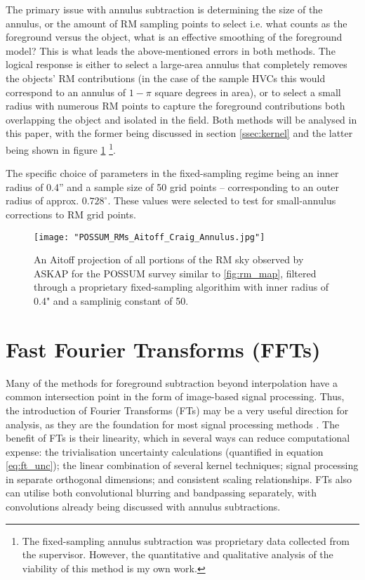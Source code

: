 The primary issue with annulus subtraction is determining the size of the annulus, or the amount of RM sampling points to select i.e. what counts as the foreground versus the object, what is an effective smoothing of the foreground model? This is what leads the above-mentioned errors in both methods. The logical response is either to select a large-area annulus that completely removes the objects' RM contributions (in the case of the sample HVCs this would correspond to an annulus of $1-\pi$ square degrees in area), or to select a small radius with numerous RM points to capture the foreground contributions both overlapping the object and isolated in the field. Both methods will be analysed in this paper, with the former being discussed in section \ref{ssec:kernel} and the latter being shown in figure \ref{fig:annulus_sky} \footnote{The fixed-sampling annulus subtraction was proprietary data collected from the supervisor. However, the quantitative and qualitative analysis of the viability of this method is my own work.}.

The specific choice of parameters in the fixed-sampling regime being an inner radius of 0.4” and a sample size of 50 grid points – corresponding to an outer radius of approx. $0.728^{\circ}$. These values were selected to test for small-annulus corrections to RM grid points.

\begin{figure}
    \texttt{[image: "POSSUM\_RMs\_Aitoff\_Craig\_Annulus.jpg"]}
    \centering
    \caption{An Aitoff projection of all portions of the RM sky observed by ASKAP for the POSSUM survey similar to \ref{fig:rm_map}, filtered through a proprietary fixed-sampling algorithim with inner radius of 0.4" and a samplinig constant of 50.}
    \label{fig:annulus_sky}
\end{figure}

\section{Fast Fourier Transforms (FFTs)}
\label{sec:ffts}

Many of the methods for foreground subtraction beyond interpolation have a common intersection point in the form of image-based signal processing. Thus, the introduction of Fourier Transforms (FTs) may be a very useful direction for analysis, as they are the foundation for most signal processing methods \citep{ID38}. The benefit of FTs is their linearity, which in several ways can reduce computational expense: the trivialisation uncertainty calculations (quantified in equation \ref{eq:ft_unc}); the linear combination of several kernel techniques; signal processing in separate orthogonal dimensions; and consistent scaling relationships. FTs also can utilise both convolutional blurring and bandpassing separately, with convolutions already being discussed with annulus subtractions.


